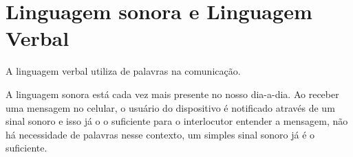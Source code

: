 \documentclass[
	12pt,				%
	openright,			%
	oneside,			%
	a4paper,			%
	english,			%
	french,				%
	spanish,			%
	brazil				%
	]{abntex2}
\begin{document}
\section{Linguagem sonora e Linguagem Verbal}
A linguagem verbal utiliza de palavras na comunicação.
\par
A linguagem sonora está cada vez mais presente no nosso dia-a-dia.
Ao receber uma mensagem no celular, o usuário do dispositivo é
notificado através de um sinal sonoro e isso já o o suficiente
para o interlocutor entender a mensagem, não há necessidade de
palavras nesse contexto, um simples sinal sonoro já é o suficiente.

\postextual{}


\end{document}
